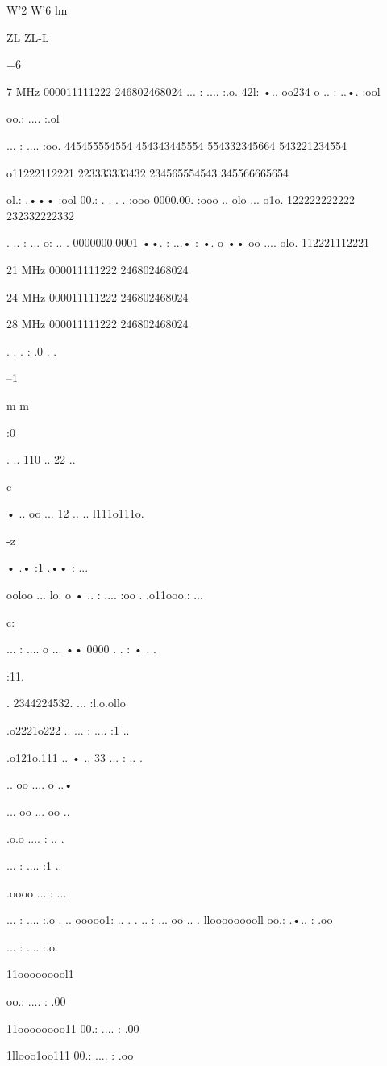 W'2
W'6
lm

ZL
ZL-L

=6

7 MHz
000011111222
246802468024
... : .... :.o.
42l: •.. oo234
o .. : ..•. :ool

oo.: .... :.ol

... : .... :oo.
445455554554
454343445554
554332345664
543221234554

o11222112221
223333333432
234565554543
345566665654

ol.: .••• :ool
00.: . . . . :ooo
0000.00. :ooo
.. olo ... o1o.
122222222222
232332222332

. .. : ... o: .. .
0000000.0001
••. : ...• : •. o
•• oo .... olo.
112221112221

21 MHz
000011111222
246802468024

24 MHz
000011111222
246802468024

28 MHz
000011111222
246802468024

. . . : .0 . .

--1

m
m

:0

. .. 110 .. 22 ..

c

• .. oo ... 12 ..
.. l111o111o.

-z

• .• :1 .•• : ...

ooloo ... lo. o
• .. : .... :oo .
.o11ooo.: ...

c:

... : .... o ...
•• 0000 . . : • . .

:11.

. 2344224532.
... :l.o.ollo

.o2221o222 ..
... : .... :1 ..

.o121o.111 ..
• .. 33 ... : .. .

.. oo .... o ..•

... oo ... oo ..

.o.o .... : .. .

... : .... :1 ..

.oooo ... : ...

... : .... :.o .
.. ooooo1: .. .
. .. : ... oo .. .
llooooooooll
oo.: .•.. : .oo

... : .... :.o.

11ooooooool1

oo.: .... : .00

11oooooooo11
00.: .... : .00

1llooo1oo111
00.: .... : .oo

